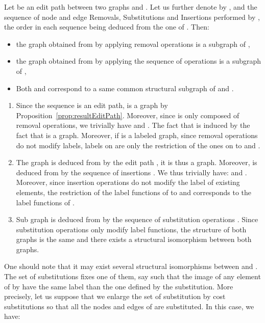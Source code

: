 \begin{proposition}\label{prop:editPathSubGraphs}
  Let  be an edit path between two graphs  and . Let us
  further denote by ,  and  the sequence of node and edge
  Removals, Substitutions and Insertions performed by , the order
  in each sequence being deduced from the one of . Then:
  \begin{itemize}
  \item the graph  obtained from  by applying
    removal operations  is a subgraph of ,
  \item the graph  obtained from  by applying
    the sequence of operations  is a subgraph of ,
  \item Both  and  correspond to a same common
    structural subgraph of  and .
  \end{itemize}
\end{proposition}
  \begin{enumerate}
  \item Since the sequence  is an edit path,  is a
    graph by Proposition~\ref{prop:resultEditPath}. Moreover, since
     is only composed of removal operations, we trivially have
     and . The fact that
     is induced
    by the fact that  is a graph. Moreover, if  is a
    labeled graph, since removal operations do not modify labels,
    labels on  are only the restriction of the ones on
     to  and .
  \item The graph  is deduced from  by the edit path
    , it is thus a graph. Moreover,  is deduced from
     by the sequence of insertions . We thus trivially
    have:  and .  Moreover, since insertion operations
    do not modify the label of existing elements, the restriction of
    the label functions of  to  and 
    corresponds to the label functions of .
  \item Sub graph  is deduced from  by the
    sequence of substitution operations . Since substitution
    operations only modify label functions, the structure of both
    graphs is the same and there exists a structural isomorphism
    between both graphs.~~{}
  \end{enumerate}
One should note that it may exist several structural isomorphisms
between  and . The set of substitutions 
fixes one of them, say  such that the image of any element of
 by  have the same label than the one defined by the
substitution. More precisely, let us suppose that we enlarge the set
of substitution  by  cost substitutions so that all the
nodes and edges of 
are substituted. In this case, we have:

